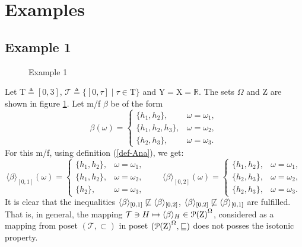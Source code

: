 \documentclass[sn-mathphys,Numbered,pdflatex]{sn-jnl}%
\theoremstyle{thmstyleone}%
\theoremstyle{thmstyletwo}%
\theoremstyle{thmstylethree}%
\newcommand{\mydef}{\mathrel{\triangleq}}%
\newcommand{\icP}[1]{\EuScript{P}({#1})}%
\newcommand{\myLe}{\mathrel{\sqsubseteq}}%
\newcommand{\RA}{\ensuremath{\mathbb R}}%
\newcommand{\naY}{\ensuremath{\mathrm{Y}}}%
\newcommand{\naX}{\ensuremath{\mathrm{X}}}%
\newcommand{\naOm}{\ensuremath{\Omega}}%
\newcommand{\naZ}{\ensuremath{\mathrm{Z}}}%
\newcommand{\naT}{\ensuremath{\mathrm{T}}}%
\newcommand{\naTc}{\ensuremath{\mathcal{T}}}%
\newcommand{\Ana}[2]{\ensuremath{\langle{#1}\rangle_{#2}}}%
\newcommand{\fref}[1]{{\rm(\ref{#1})}}   %
\begin{document}
\section{Examples}
\label{EXAM}

\subsection{Example 1}
\label{ex1}

\begin{figure}[!ht]
\begin{center}
\hspace*{-0.5cm}

\caption{Example 1}\label{pic1-ex1}
\end{center}
\end{figure}

Let $\naT\mydef[0,3]$, $\naTc\mydef\{[0,\tau]\mid\tau\in\naT\}$ and $\naY=\naX=\RA$.
The sets $\naOm$ and $\naZ$ are shown in figure \ref{pic1-ex1}.
Let m/f $\beta$ be of the form
$$
\beta(\omega)=
\begin{cases}
\{h_1,h_2\},&\omega=\omega_1,\\
\{h_1,h_2,h_3\},&\omega=\omega_2,\\
\{h_2,h_3\},&\omega=\omega_3.
\end{cases}
$$
For this m/f, using definition \fref{def-Ana}, we get:
$$
\Ana{\beta}{[0,1]}(\omega)=
\begin{cases}
\{h_1,h_2\},&\omega=\omega_1,\\
\{h_1,h_2\},&\omega=\omega_2,\\
\{h_2\},&\omega=\omega_3,
\end{cases}
\qquad
\Ana{\beta}{[0,2]}(\omega)=
\begin{cases}
\{h_1,h_2\},&\omega=\omega_1,\\
\{h_2,h_3\},&\omega=\omega_2,\\
\{h_2,h_3\},&\omega=\omega_3.
\end{cases}
$$
It is clear that the inequalities $\Ana{\beta}{[0,1]}\not\myLe\Ana{\beta}{[0,2]}$, $\Ana{\beta}{[0,2 ]}\not\myLe\Ana{\beta}{[0,1]}$ are fulfilled.
That is, in general, the mapping $\naTc\ni H\mapsto\Ana{\beta}{H}\in{\icP\naZ}^\naOm$, considered as a mapping from poset $(\naTc,\subset)$ in poset $({\icP\naZ}^\naOm,\myLe)$ does not posses the isotonic property.


\end{document}
